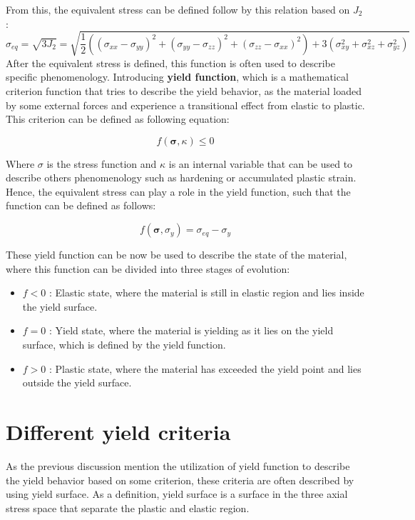 \documentclass[12pt]{article}
\begin{document}
From this, the equivalent stress can be defined follow by this relation based on $J_2$:
\begin{equation}
    \sigma_{eq} = \sqrt{3J_2} = \sqrt{\frac{1}{2} \left( (\sigma_{xx} - \sigma_{yy})^2 + (\sigma_{yy} - \sigma_{zz})^2 + (\sigma_{zz} - \sigma_{xx})^2 \right) + 3(\sigma_{xy}^2 + \sigma_{xz}^2 + \sigma_{yz}^2)}
\end{equation}
\hspace{2em}After the equivalent stress is defined, this function is often used to describe specific phenomenology.
Introducing \textbf{yield function}, which is a mathematical criterion function that tries to describe the yield behavior,
as the material loaded by some external forces and experience a transitional effect from elastic to plastic. This criterion 
can be defined as following equation:

\begin{equation}
    f(\boldsymbol{\sigma}, \kappa) \leq 0
\end{equation}

\hspace{2em}Where $\sigma$ is the stress function and $\kappa$ is
an internal variable that can be used to describe others phenomenology such as hardening or 
accumulated plastic strain. Hence, the equivalent stress can play a role in the yield function, such
that the function can be defined as follows: 

\begin{equation}
    f(\boldsymbol{\sigma}, \sigma_y) = \sigma_{eq} - \sigma_y
\end{equation}

These yield function can be now be used to describe the state of the material,
where this function can be divided into three stages of evolution:
\begin{itemize}
    \item $f < 0$ : Elastic state, where the material is still in elastic region and lies inside the yield surface.
    \item $f = 0$ : Yield state, where the material is yielding as it lies on the yield surface, which is defined by the yield function.
    \item $f > 0$ : Plastic state, where the material has exceeded the yield point and lies outside the yield surface. 
\end{itemize}


\section{Different yield criteria}
\hspace{2em}As the previous discussion mention the utilization of yield function to describe the yield behavior based on some 
criterion, these criteria are often described by using yield surface. As a definition, yield surface
is a surface in the three axial stress space that separate the plastic and elastic region.
\end{document}
